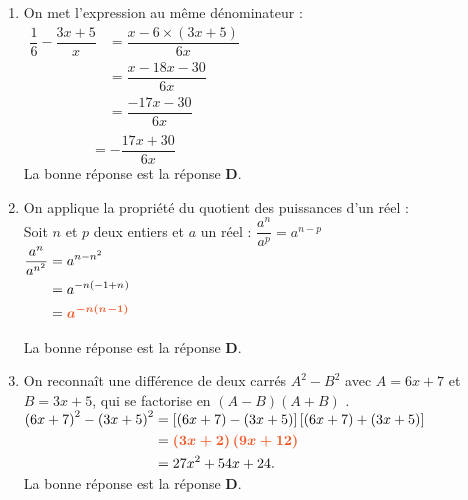 \documentclass[a4paper,11pt]{article}
\newcounter{seancenum}
\begin{document}
\setcounter{seancenum}{27}
\newpage
\begin{seance}{} %

\begin{enumerate}
\item On met l'expression au même dénominateur : \\$\begin{aligned}
        \dfrac{1}{6}-\dfrac{3x+5}{x}&=\dfrac{x-6\times \left(3x+5\right)}{6x}\\
        &=\dfrac{x -18x -30}{6x}\\
        &=\dfrac{-17x -30}{6x}\\
     \end{aligned}$\\$\phantom{\dfrac{1}{6}-\dfrac{3x+5}{x}}=-\dfrac{17x +30}{6x}$\\La bonne réponse est la réponse {\bfseries \color[HTML]{F15929}D}.

\item On applique la propriété du quotient des puissances d'un réel : \\
      Soit $n$ et $p$ deux entiers et $a$ un réel :  $\dfrac{a^n}{a^p}=a^{n-p}$\\
      $\begin{aligned} \dfrac{a^{n}}{a^{n^{2}}}&=a^{n-n^{2}}\\
      &=a^{-n(-1+n^{})}\\
      &={\color[HTML]{F15929}\boldsymbol{a^{-n(n^{}-1)}}}
      \end{aligned}$

\medskip
La bonne réponse est la réponse {\bfseries \color[HTML]{F15929}D}.

\item On reconnaît une différence de deux carrés $A^2-B^2$ avec $A=6x+7$ et $B=3x+5$, qui se factorise en $(A-B)(A+B)$ .\\
    $\begin{aligned}
    \left(6x+7\right)^2-\left(3x+5\right)^2&=\left[\left(6x+7\right)-\left(3x+5\right)\right]\left[\left(6x+7\right)+\left(3x+5\right)\right]\\
    &={\color[HTML]{F15929}\boldsymbol{\left(3x+2\right)\left(9x+12\right)}}\\
    &=27x^{2}+54x+24.
    \end{aligned}$\\La bonne réponse est la réponse {\bfseries \color[HTML]{F15929}D}.


\end{enumerate}
\end{seance}
\end{document}
